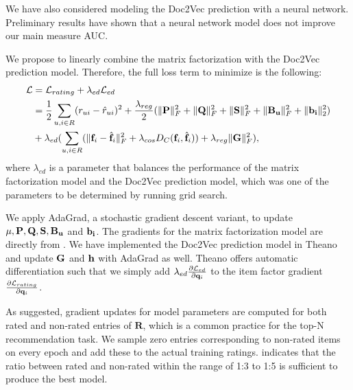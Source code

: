 We have also considered modeling the Doc2Vec prediction with a neural network.
Preliminary results have shown that a neural network model does not improve our main measure AUC.


We propose to linearly combine the matrix factorization with the Doc2Vec prediction model.
Therefore, the full loss term to minimize is the following:
\begin{equation}
\begin{aligned}
	\mathcal{L} &= \mathcal{L}_{rating} + \lambda_{ed} \mathcal{L}_{ed} \\
				&= \frac{1}{2} \sum_{u,i \in R} (r_{ui} - \hat{r}_{ui})^2 + \frac{\lambda_{reg}}{2} (\lVert{\ensuremath{\mathbf{P}}}\rVert_F^2 + \lVert{\ensuremath{\mathbf{Q}}}\rVert_F^2 + \lVert{\ensuremath{\mathbf{S}}}\rVert_F^2 + \lVert{\ensuremath{\mathbf{B_u}}}\rVert_F^2 + \lVert{\ensuremath{\mathbf{b_i}}}\rVert_2^2) \\
				& + \lambda_{ed} (\sum_{u,i \in R} (\lVert{\ensuremath{\mathbf{f}}_i - \hat{\ensuremath{\mathbf{f}}}_i}\rVert_F^2 + \lambda_{cos} D_C(\mathbf{f}_i, \hat{\mathbf{f}}_i)) + \lambda_{reg} \lVert{\ensuremath{\mathbf{G}}}\rVert_F^2),
\end{aligned}
\end{equation}
where $\lambda_{ed}$ is a parameter that balances the performance of the matrix factorization model and the Doc2Vec prediction model, which was one of the parameters to be determined by running grid search.


We apply AdaGrad, a stochastic gradient descent variant, to update $\mu, \mathbf{P}, \mathbf{Q}, \mathbf{S}, \mathbf{B_u}$ and $\mathbf{b_i}$.
The gradients for the matrix factorization model are directly from \cite{Kabbur2015}.
We have implemented the Doc2Vec prediction model in Theano and update $\mathbf{G}$ and $\mathbf{h}$ with AdaGrad as well.
Theano offers automatic differentiation such that we simply add $\lambda_{ed} \frac{\partial \mathcal{L}_{ed}}{\partial \mathbf{q}_i}$ to the item factor gradient $\frac{\partial \mathcal{L}_{rating}}{\partial \mathbf{q}_i}$.

As \cite{Kabbur2015} suggested, gradient updates for model parameters are computed for both rated and non-rated entries of $\mathbf{R}$, which is a common practice for the top-N recommendation task.
We sample zero entries corresponding to non-rated items on every epoch and add these to the actual training ratings.
\cite{Kabbur2015} indicates that the ratio between rated and non-rated within the range of 1:3 to 1:5 is sufficient to produce the best model.

